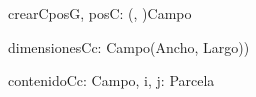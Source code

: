 \begin{problema}{crearC}{posG, posC: (\ent, \ent)}{Campo}
\end{problema}

\begin{problema}{dimensionesC}{c: Campo}{(Ancho, Largo))}
\end{problema}

\begin{problema}{contenidoC}{c: Campo, i, j: \ent}{Parcela}
\end{problema}
